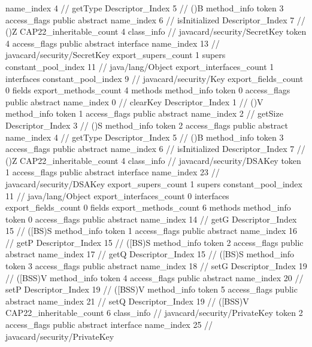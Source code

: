 {{{{{					name_index	4		// getType
					Descriptor_Index	5		// ()B
				}
				method_info {
					token	3
					access_flags	public abstract
					name_index	6		// isInitialized
					Descriptor_Index	7		// ()Z
				}
			}
			CAP22_inheritable_count	4
		}
		class_info {		// javacard/security/SecretKey
			token	4
			access_flags	public abstract interface
			name_index	13		// javacard/security/SecretKey
			export_supers_count	1
			supers {
				constant_pool_index	11		// java/lang/Object
			}
			export_interfaces_count	1
			interfaces {
				constant_pool_index	9		// javacard/security/Key
			}
			export_fields_count	0
			fields {
			}
			export_methods_count	4
			methods {
				method_info {
					token	0
					access_flags	public abstract
					name_index	0		// clearKey
					Descriptor_Index	1		// ()V
				}
				method_info {
					token	1
					access_flags	public abstract
					name_index	2		// getSize
					Descriptor_Index	3		// ()S
				}
				method_info {
					token	2
					access_flags	public abstract
					name_index	4		// getType
					Descriptor_Index	5		// ()B
				}
				method_info {
					token	3
					access_flags	public abstract
					name_index	6		// isInitialized
					Descriptor_Index	7		// ()Z
				}
			}
			CAP22_inheritable_count	4
		}
		class_info {		// javacard/security/DSAKey
			token	1
			access_flags	public abstract interface
			name_index	23		// javacard/security/DSAKey
			export_supers_count	1
			supers {
				constant_pool_index	11		// java/lang/Object
			}
			export_interfaces_count	0
			interfaces {
			}
			export_fields_count	0
			fields {
			}
			export_methods_count	6
			methods {
				method_info {
					token	0
					access_flags	public abstract
					name_index	14		// getG
					Descriptor_Index	15		// ([BS)S
				}
				method_info {
					token	1
					access_flags	public abstract
					name_index	16		// getP
					Descriptor_Index	15		// ([BS)S
				}
				method_info {
					token	2
					access_flags	public abstract
					name_index	17		// getQ
					Descriptor_Index	15		// ([BS)S
				}
				method_info {
					token	3
					access_flags	public abstract
					name_index	18		// setG
					Descriptor_Index	19		// ([BSS)V
				}
				method_info {
					token	4
					access_flags	public abstract
					name_index	20		// setP
					Descriptor_Index	19		// ([BSS)V
				}
				method_info {
					token	5
					access_flags	public abstract
					name_index	21		// setQ
					Descriptor_Index	19		// ([BSS)V
				}
			}
			CAP22_inheritable_count	6
		}
		class_info {		// javacard/security/PrivateKey
			token	2
			access_flags	public abstract interface
			name_index	25		// javacard/security/PrivateKey
}}}
